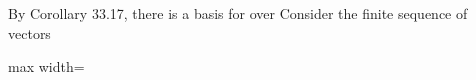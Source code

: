 \documentclass[11pt,oneside]{article}
\begin{document}
\begin{BookBody}
 By Corollary 33.17, there is a basis  for  over  Consider the finite sequence of vectors

\begin{center}\begin{adjustbox}{max width=\linewidth}\end{adjustbox}\end{center}

\end{BookBody}

\BookNarrativetrue
\end{document}
